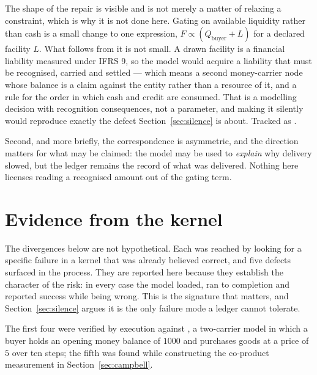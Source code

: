 \documentclass[11pt,a4paper]{article}
\begin{document}
The shape of the repair is visible and is not merely a matter of relaxing a constraint, which is why it is not done here. Gating on available liquidity rather than cash is a small change to one expression, $F \propto (Q_{\text{buyer}} + L)$ for a declared facility $L$. What follows from it is not small. A drawn facility is a financial liability measured under IFRS 9, so the model would acquire a liability that must be recognised, carried and settled --- which means a second money-carrier node whose balance is a claim against the entity rather than a resource of it, and a rule for the order in which cash and credit are consumed. That is a modelling decision with recognition consequences, not a parameter, and making it silently would reproduce exactly the defect Section~\ref{sec:silence} is about. Tracked as .

Second, and more briefly, the correspondence is asymmetric, and the direction matters for what may be claimed: the model may be used to \emph{explain} why delivery slowed, but the ledger remains the record of what was delivered. Nothing here licenses reading a recognised amount out of the gating term.

\section{Evidence from the kernel}
\label{sec:findings}

The divergences below are not hypothetical. Each was reached by looking for a specific failure in a kernel that was already believed correct, and five defects surfaced in the process. They are reported here because they establish the character of the risk: in every case the model loaded, ran to completion and reported success while being wrong. This is the signature that matters, and Section~\ref{sec:silence} argues it is the only failure mode a ledger cannot tolerate.

The first four were verified by execution against , a two-carrier model in which a buyer holds an opening money balance of $1000$ and purchases goods at a price of $5$ over ten steps; the fifth was found while constructing the co-product measurement in Section~\ref{sec:campbell}.
\end{document}
